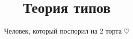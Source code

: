 \documentclass{article}
\title{Теория типов}
\author{Человек, который поспорил на 2 торта $\heartsuit$}
\date{}
\begin{document}
\theoremstyle{definition}
\newtheorem*{definition}{Определение}
\theoremstyle{plain}
\newtheorem{theorem}{Теорема}[section]
\newtheorem{axiom}{Аксиома}
\newtheorem{lemma}[theorem]{Лемма}
\newtheorem{statement}[theorem]{Утверждение}
\theoremstyle{remark}
\newtheorem*{example}{Пример}

\lstset{language=C++}

\maketitle




\end{document}
